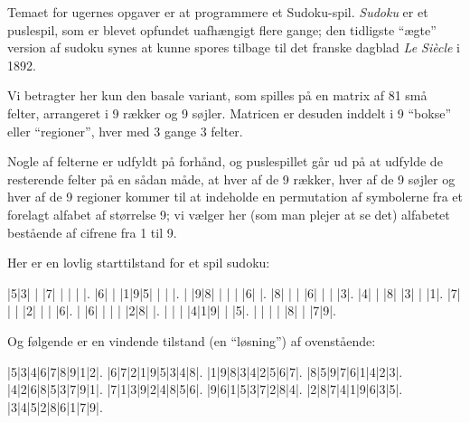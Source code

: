 Temaet for ugernes opgaver er at programmere et Sudoku-spil. \emph{Sudoku} er et puslespil, som er blevet opfundet uafh{\ae}ngigt flere gange; den tidligste ``{\ae}gte'' version af sudoku synes at kunne spores tilbage til det franske dagblad \emph{Le Si{\`e}cle} i 1892.

Vi betragter her kun den basale variant, som spilles p{\aa} en matrix af 81 sm{\aa} felter, arrangeret i 9 r{\ae}kker og 9 s{\o}jler.  Matricen er desuden inddelt i 9 ``bokse'' eller ``regioner'', hver med 3 gange 3 felter.

Nogle af felterne er udfyldt p{\aa} forh{\aa}nd, og puslespillet g{\aa}r ud p{\aa} at udfylde de resterende felter p{\aa} en s{\aa}dan m{\aa}de, at hver af de 9 r{\ae}kker, hver af de 9 s{\o}jler og hver af de 9 regioner kommer til at indeholde en permutation af symbolerne fra et forelagt alfabet af st{\o}rrelse 9; vi v{\ae}lger her (som man plejer at se det) alfabetet best{\aa}ende af cifrene fra 1 til 9.

Her er en lovlig starttilstand for et spil sudoku:
\begin{sudoku}
|5|3| | |7| | | | |.
|6| | |1|9|5| | | |.
| |9|8| | | | |6| |.
|8| | | |6| | | |3|.
|4| | |8| |3| | |1|.
|7| | | |2| | | |6|.
| |6| | | | |2|8| |.
| | | |4|1|9| | |5|.
| | | | |8| | |7|9|.
\end{sudoku}

Og f{\o}lgende er en vindende tilstand (en ``l{\o}sning'') af ovenst{\aa}ende:
\begin{sudoku}
|5|3|4|6|7|8|9|1|2|.
|6|7|2|1|9|5|3|4|8|.
|1|9|8|3|4|2|5|6|7|.
|8|5|9|7|6|1|4|2|3|.
|4|2|6|8|5|3|7|9|1|.
|7|1|3|9|2|4|8|5|6|.
|9|6|1|5|3|7|2|8|4|.
|2|8|7|4|1|9|6|3|5|.
|3|4|5|2|8|6|1|7|9|.
\end{sudoku}

